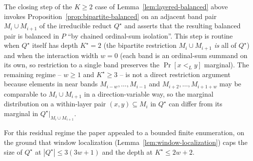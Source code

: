 \begin{remark}
\label{rem:residual-base}
The closing step of the $K \ge 2$ case of
Lemma~\ref{lem:layered-balanced} above invokes
Proposition~\ref{prop:bipartite-balanced} on an adjacent band pair
$M_i \cup M_{i+1}$ of the irreducible reduct $Q^\star$ and asserts that
the resulting balanced pair is balanced in $P$ ``by chained ordinal-sum
isolation''. This step is routine when $Q^\star$ itself has depth
$K^\star = 2$ (the bipartite restriction $M_i \cup M_{i+1}$ \emph{is}
all of $Q^\star$) and when the interaction width $w = 0$ (each band is
an ordinal-sum summand on its own, so restriction to a single band
preserves the $\Pr[x <_L y]$ marginal). The remaining regime --
$w \ge 1$ and $K^\star \ge 3$ -- is not a direct restriction argument
because elements in near bands $M_{i-w},\dots,M_{i-1}$ and
$M_{i+2},\dots,M_{i+1+w}$ may be comparable to $M_i \cup M_{i+1}$ in
a direction-variable way, so the marginal distribution on a
within-layer pair $(x,y) \subseteq M_i$ in $Q^\star$ can differ from
its marginal in $Q^\star|_{M_i \cup M_{i+1}}$.

For this residual regime the paper appealed to a bounded finite
enumeration, on the ground that window localization
(Lemma~\ref{lem:window-localization}) caps the size of $Q^\star$ at
$|Q^\star| \le 3(3w+1)$ and the depth at $K^\star \le 2w+2$.



\end{remark}
